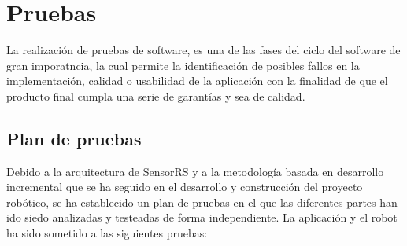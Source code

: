 

\newpage

\chapter{ Pruebas }
\label{chap:pruebas}

La realización de pruebas de software, es una de las fases del ciclo del software de gran imporatncia, la cual permite la identificación de posibles fallos en la implementación, 
calidad o usabilidad de la aplicación con la finalidad de que el producto final cumpla una serie de garantías y sea de calidad.\\

\section{Plan de pruebas}

Debido a la arquitectura de SensorRS y a la metodología basada en desarrollo incremental que se ha seguido en el desarrollo y construcción del proyecto robótico,
se ha establecido un plan de pruebas en el que las diferentes partes han ido siedo analizadas y testeadas de forma independiente. La aplicación y el robot ha sido sometido 
a las siguientes pruebas:\\

